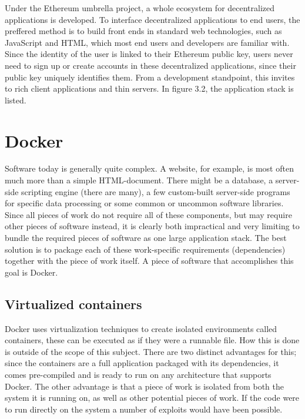 Under the Ethereum umbrella project, a whole ecosystem for decentralized applications is developed. To interface decentralized applications to end users, the preffered method is to build front ends in standard web technologies, such as JavaScript and HTML, which most end users and developers are familiar with. Since the identity of the user is linked to their Ethereum public key, users never need to sign up or create accounts in these decentralized applications, since their public key uniquely identifies them.
From a development standpoint, this invites to rich client applications and thin servers. In figure 3.2, the application stack is listed. 

\section{Docker}
Software today is generally quite complex. A website, for example, is most often much more than a simple HTML-document. There might be a database, a server-side scripting engine (there are many), a few custom-built server-side programs for specific data processing or some common or uncommon software libraries. Since all pieces of work do not require all of these components, but may require other pieces of software instead, it is clearly both impractical and very limiting to bundle the required pieces of software as one large application stack. The best solution is to package each of these work-specific requirements (dependencies) together with the piece of work itself. A piece of software that accomplishes this goal is Docker.

\subsection{Virtualized containers}
Docker uses virtualization techniques to create isolated environments called containers, these can be executed as if they were a runnable file. How this is done is outside of the scope of this subject.
There are two distinct advantages for this; since the containers are a full application packaged with its dependencies, it comes pre-compiled and is ready to run on any architecture that supports Docker. 
The other advantage is that a piece of work is isolated from both the system it is running on, as well as other potential pieces of work. If the code were to run directly on the system a number of exploits would have been possible.~\cite{korpela:2012}

